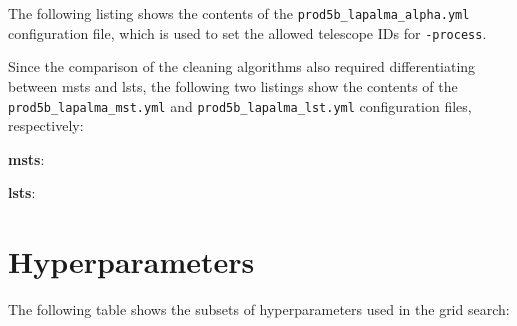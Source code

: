 The following listing shows the contents of the \texttt{prod5b\_lapalma\_alpha.yml} configuration file,
which is used to set the allowed telescope IDs for \ctapipe{}\texttt{-process}.
\begin{spacing}{0.5}
    \begin{mdframed}[backgroundcolor=codebg, hidealllines=true, leftmargin=0cm,rightmargin=0cm, skipabove=0pt, innerleftmargin=0,innerrightmargin=0,]
    
    \end{mdframed}
\end{spacing}

Since the comparison of the cleaning algorithms also required differentiating between \glspl{mst}
and \glspl{lst}, the following two listings show the contents of the \texttt{prod5b\_lapalma\_mst.yml} and
\texttt{prod5b\_lapalma\_lst.yml} configuration files, respectively:
\begin{description}
    \item \textbf{\glspl{mst}}:\medskip
    \begin{spacing}{0.5}
        \begin{mdframed}[backgroundcolor=codebg, hidealllines=true, leftmargin=0cm,rightmargin=0cm, skipabove=0pt, innerleftmargin=0,innerrightmargin=0,]
        
        \end{mdframed}
    \end{spacing}

    \item \textbf{\glspl{lst}}:\medskip
    \begin{spacing}{0.5}
        \begin{mdframed}[backgroundcolor=codebg, hidealllines=true, leftmargin=0cm,rightmargin=0cm, skipabove=0pt, innerleftmargin=0,innerrightmargin=0,]
        
        \end{mdframed}
    \end{spacing}
\end{description}


\section{Hyperparameters}
\label{ap:hyperparameters}

The following table shows the subsets of hyperparameters used in the grid search:

